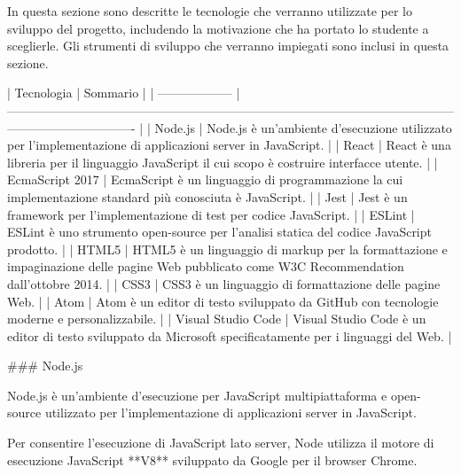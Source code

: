 In questa sezione sono descritte le tecnologie che verranno utilizzate per lo sviluppo del progetto, includendo la motivazione che ha portato lo studente a sceglierle.
Gli strumenti di sviluppo che verranno impiegati sono inclusi in questa sezione.

| Tecnologia         | Sommario                                                                                                                                    |
| ------------------ | ------------------------------------------------------------------------------------------------------------------------------------------- |
| Node.js            | Node.js è un'ambiente d'esecuzione utilizzato per l'implementazione di applicazioni server in JavaScript.                                   |
| React              | React è una libreria per il linguaggio JavaScript il cui scopo è costruire interfacce utente.                                               |
| EcmaScript 2017    | EcmaScript è un linguaggio di programmazione la cui implementazione standard più conosciuta è JavaScript.                                   |
| Jest               | Jest è un framework per l'implementazione di test per codice JavaScript.                                                                    |
| ESLint             | ESLint è uno strumento open-source per l'analisi statica del codice JavaScript prodotto.                                                    |
| HTML5              | HTML5 è un linguaggio di markup per la formattazione e impaginazione delle pagine Web pubblicato come W3C Recommendation dall'ottobre 2014. |
| CSS3               | CSS3 è un linguaggio di formattazione delle pagine Web.                                                                                     |
| Atom               | Atom è un editor di testo sviluppato da GitHub con tecnologie moderne e personalizzabile.                                                   |
| Visual Studio Code | Visual Studio Code è un editor di testo sviluppato da Microsoft specificatamente per i linguaggi del Web.                                   |


### Node.js

Node.js è un'ambiente d'esecuzione per JavaScript multipiattaforma e open-source utilizzato per l'implementazione di applicazioni server in JavaScript.

Per consentire l'esecuzione di JavaScript lato server, Node utilizza il motore di esecuzione JavaScript **V8** sviluppato da Google per il browser Chrome.

